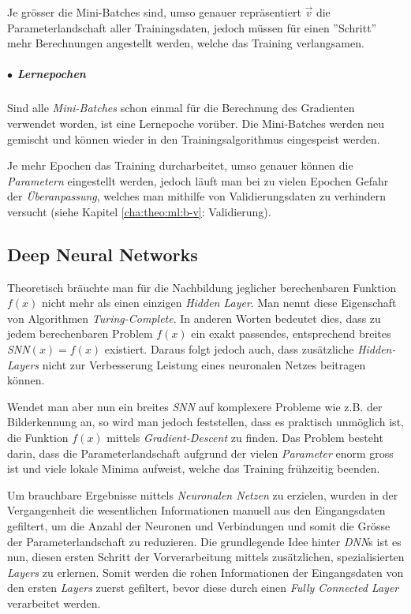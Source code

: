 Je grösser die Mini-Batches sind, umso genauer repräsentiert $\vec{v}$ die Parameterlandschaft aller Trainingsdaten, jedoch müssen für einen ''Schritt'' mehr Berechnungen angestellt werden, welche das Training verlangsamen.


\subparagraph{$\bullet$ Lernepochen} Sind alle \textit{Mini-Batches} schon einmal für die Berechnung des Gradienten verwendet worden, ist eine Lernepoche vorüber. Die Mini-Batches werden neu gemischt und können wieder in den Trainingsalgorithmus eingespeist werden.

Je mehr Epochen das Training durcharbeitet, umso genauer können die \textit{Parametern} eingestellt werden, jedoch läuft man bei zu vielen Epochen Gefahr der \textit{Überanpassung}, welches man mithilfe von Validierungsdaten zu verhindern versucht (siehe Kapitel \ref{cha:theo:ml:b-v}: Validierung).


\subsection[DNNs]{Deep Neural Networks}\label{cha:theo:dl}
Theoretisch bräuchte man für die Nachbildung jeglicher berechenbaren Funktion $f(x)$ nicht mehr als einen einzigen \textit{Hidden Layer}. Man nennt diese Eigenschaft von Algorithmen \textit{Turing-Complete}. In anderen Worten bedeutet dies, dass zu jedem berechenbaren Problem $f(x)$ ein exakt passendes, entsprechend breites \textit{SNN}$(x) = f(x)$ existiert\cite{siegelmann}. Daraus folgt jedoch auch, dass zusätzliche \textit{Hidden-Layers} nicht zur Verbesserung Leistung eines neuronalen Netzes beitragen können\footnotemark.\\


Wendet man aber nun ein breites \textit{SNN} auf komplexere Probleme wie z.B. der Bilderkennung an, so wird man jedoch feststellen, dass es praktisch unmöglich ist, die Funktion $f(x)$ mittels \textit{Gradient-Descent} zu finden. Das Problem besteht darin, dass die Parameterlandschaft aufgrund der vielen \textit{Parameter} enorm gross ist und viele lokale Minima aufweist, welche das Training frühzeitig beenden.

Um brauchbare Ergebnisse mittels \textit{Neuronalen Netzen} zu erzielen, wurden in der Vergangenheit die wesentlichen Informationen manuell aus den Eingangsdaten gefiltert, um die Anzahl der Neuronen und Verbindungen und somit die Grösse der Parameterlandschaft zu reduzieren. Die grundlegende Idee hinter \textit{DNN}s ist es nun, diesen ersten Schritt der Vorverarbeitung mittels zusätzlichen, spezialisierten \textit{Layers} zu erlernen. Somit werden die rohen Informationen der Eingangsdaten von den ersten \textit{Layers} zuerst gefiltert, bevor diese durch einen \textit{Fully Connected Layer} verarbeitet werden.\\


